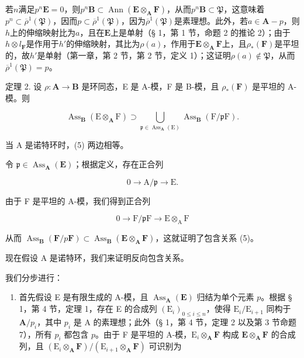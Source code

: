 若\(n\)满足\(p^n\mathbf{E} = 0\)，则\(p^n\mathbf{B} \subset \operatorname{Ann}(\mathbf{E} \otimes_{\mathbf{A}} \mathbf{F})\)，从而\(p^n\mathbf{B} \subset \mathfrak{P}\)，这意味着\(p^n \subset \overline{\rho}^1(\mathfrak{P})\)，因而\(p \subset \overline{\rho}^1(\mathfrak{P})\)，因为\(\overline{\rho}^1(\mathfrak{P})\)是素理想。此外，若\(a \in \mathbf{A} - p\)，则\(h\)上的伸缩映射比为\(a\)，且在\(\mathbf{E}\)上是单射（§ 1，第 1 节，命题 2 的推论 2）；由于\(h \otimes l_{\mathbf{F}}\)是作用于\(h'\)的伸缩映射，其比为\(\rho(a)\)，作用于\(\mathbf{E} \otimes_{\mathbf{A}} \mathbf{F}\)上，且\(\rho_*(\mathbf{F})\)是平坦的，故\(h'\)是单射（第一章，第 2 节，第 2 节，定义 1）；这证明\(\rho(a) \notin \mathfrak{P}\)，从而\(\overline{\rho}^1(\mathfrak{P}) = p\)。

定理 2. 设 \(\rho: \mathbf{A} \to \mathbf{B}\) 是环同态，E 是 A-模，F 是 B-模，且 \(\rho_*(\mathbf{F})\) 是平坦的 A-模。则

\[
\operatorname{Ass} _ {\mathbf {B}} (\mathrm{E} \otimes_ {\mathbf {A}} \mathrm{F}) \supset \bigcup_ {\mathfrak {p} \in \operatorname{Ass} _ {\mathbf {A}} (\mathrm{E})} \operatorname{Ass} _ {\mathbf {B}} (\mathrm{F} / \mathfrak {p} \mathrm{F}).\tag{5}
\]

当 A 是诺特环时，(5) 两边相等。

令 \(\mathfrak{p} \in \operatorname{Ass}_{\mathbf{A}}(\mathbf{E})\)；根据定义，存在正合列

\[
0 \rightarrow \mathrm{A} / \mathfrak {p} \rightarrow \mathrm{E}.
\]

由于 F 是平坦的 A-模，我们得到正合列

\[
0 \rightarrow \mathrm{F} / \mathfrak {p} \mathrm{F} \rightarrow \mathrm{E} \otimes_ {\mathrm{A}} \mathrm{F}
\]

从而 \(\operatorname{Ass}_{\mathbf{B}}(\mathbf{F} / p\mathbf{F})\subset \operatorname{Ass}_{\mathbf{B}}(\mathbf{E}\otimes_{\mathbf{A}}\mathbf{F})\)，这就证明了包含关系 (5)。

现在假设 A 是诺特环，我们来证明反向包含关系。

我们分步进行：

\begin{enumerate}
\def\labelenumi{(\roman{enumi})}
\tightlist
\item
  首先假设 E 是有限生成的 A-模，且 \(\operatorname{Ass}_{\mathbf{A}}(\mathbf{E})\) 归结为单个元素 \(p\)。根据 § 1，第 4 节，定理 1，存在 E 的合成列 \((\mathrm{E}_i)_{0 \leqslant i \leqslant n}\)，使得 \(\mathrm{E}_i / \mathrm{E}_{i+1}\) 同构于 \(\mathbf{A} / p_i\)，其中 \(p_i\) 是 A 的素理想；此外（§ 1，第 4 节，定理 2 以及第 3 节命题 7），所有 \(p_i\) 都包含 \(p\)。由于 F 是平坦的 A-模，\(\mathrm{E}_i \otimes_{\mathbf{A}} \mathbf{F}\) 构成 \(\mathbf{E} \otimes_{\mathbf{A}} \mathbf{F}\) 的合成列，且 \((\mathrm{E}_i \otimes_{\mathbf{A}} \mathbf{F}) / (\mathrm{E}_{i+1} \otimes_{\mathbf{A}} \mathbf{F})\) 可识别为
\end{enumerate}

